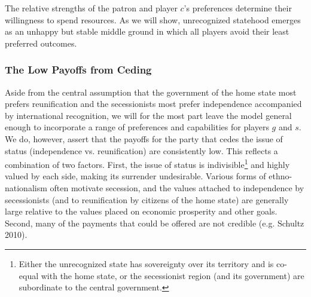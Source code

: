 \documentclass[11pt,letterpaper, notitlepage]{article}
\begin{document}
The relative strengths of the patron and player $c$'s preferences determine their willingness to spend resources. As we will show, unrecognized statehood emerges as an unhappy but stable middle ground in which all players avoid their least preferred outcomes.


\subsubsection{The Low Payoffs from Ceding}
Aside from the central assumption that the government of the home state most prefers reunification and the secessionists most prefer independence accompanied by international recognition, we will for the most part leave the model general enough to incorporate a range of preferences and capabilities for players $g$ and $s$. %
We do, however, assert that the payoffs for the party that cedes the issue of status (independence vs. reunification) are consistently low. This reflects a combination of two factors. First, the issue of status is indivisible\footnote{Either the unrecognized state has sovereignty over its territory and is co-equal with the home state, or the secessionist region (and its government) are subordinate to the central government.} and highly valued by each side, making its surrender undesirable. Various forms of ethno-nationalism often motivate secession, and the values attached to independence by secessionists (and to reunification by citizens of the home state) are generally large relative to the values placed on economic prosperity and other goals. Second, many of the payments that could be offered are not credible (e.g. Schultz 2010).
\end{document}
